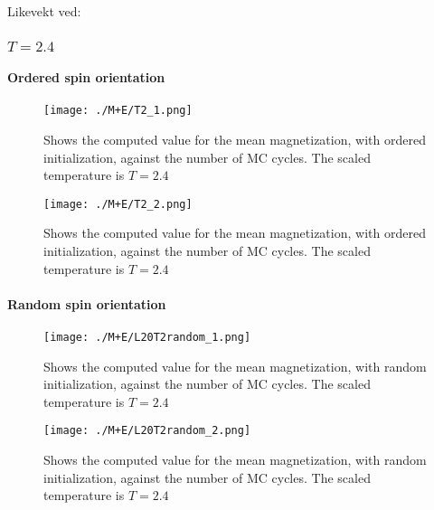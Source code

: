 \documentclass[../main.tex]{subfiles}
\begin{document}
Likevekt ved:

\subsubsection*{$T=2.4$}
\paragraph*{Ordered spin orientation}

\begin{figure}[!h]
  \texttt{[image: ./M+E/T2\_1.png]}
  \caption{Shows the computed value for the mean magnetization, with ordered initialization, against the number of MC cycles. The scaled temperature is $T=2.4$}
  \label{fig:results-MCplot}
\end{figure}
\FloatBarrier
\begin{figure}[!h]
  \texttt{[image: ./M+E/T2\_2.png]}
  \caption{Shows the computed value for the mean magnetization, with ordered initialization, against the number of MC cycles. The scaled temperature is $T=2.4$}
  \label{fig:results-MCplot}
\end{figure}
\FloatBarrier

\paragraph*{Random spin orientation}

\begin{figure}[!h]
  \texttt{[image: ./M+E/L20T2random\_1.png]}
  \caption{Shows the computed value for the mean magnetization, with random initialization, against the number of MC cycles. The scaled temperature is $T=2.4$}
  \label{fig:results-MCplot}
\end{figure}
\FloatBarrier
\begin{figure}[!h]
  \texttt{[image: ./M+E/L20T2random\_2.png]}
  \caption{Shows the computed value for the mean magnetization, with random initialization, against the number of MC cycles. The scaled temperature is $T=2.4$}
  \label{fig:results-MCplot}
\end{figure}
\FloatBarrier
\end{document}

